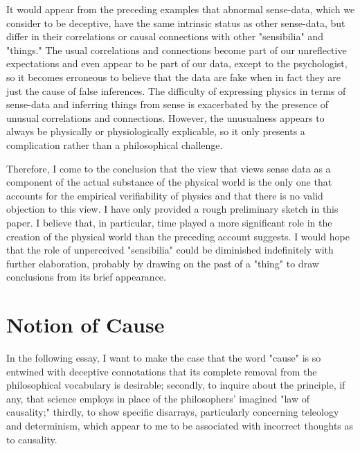 \documentclass[a4paper,12pt]{book}[2004/02/16]
\theoremstyle{ilemma}
\theoremstyle{itheorem}
\theoremstyle{iother}
\theoremstyle{icorollary}
\theoremstyle{numcorollary}
\theoremstyle{idefinition}
\begin{document}
It would appear from the preceding examples that abnormal sense-data, which we consider to be deceptive, have the same intrinsic status as other sense-data, but differ in their correlations or causal connections with other "sensibilia" and "things." The usual correlations and connections become part of our unreflective expectations and even appear to be part of our data, except to the psychologist, so it becomes erroneous to believe that the data are fake when in fact they are just the cause of false inferences. The difficulty of expressing physics in terms of sense-data and inferring things from sense is exacerbated by the presence of unusual correlations and connections. However, the unusualness appears to always be physically or physiologically explicable, so it only presents a complication rather than a philosophical challenge.

Therefore, I come to the conclusion that the view that views sense data as a component of the actual substance of the physical world is the only one that accounts for the empirical verifiability of physics and that there is no valid objection to this view. I have only provided a rough preliminary sketch in this paper. I believe that, in particular, time played a more significant role in the creation of the physical world than the preceding account suggests. I would hope that the role of unperceived "sensibilia" could be diminished indefinitely with further elaboration, probably by drawing on the past of a "thing" to draw conclusions from its brief appearance.
\chapter{Notion of Cause}
In the following essay, I want to make the case that the word "cause" is so entwined with deceptive connotations that its complete removal from the philosophical vocabulary is desirable; secondly, to inquire about the principle, if any, that science employs in place of the philosophers' imagined "law of causality;" thirdly, to show specific disarrays,
particularly concerning teleology and determinism, which appear to me
to be associated with incorrect thoughts as to causality.
\end{document}
